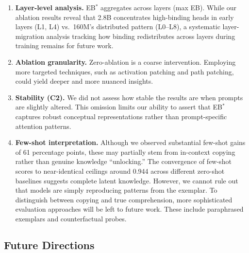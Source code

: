 \documentclass[10pt]{article} %
\begin{document}
\begin{enumerate}
  \item \textbf{Layer-level analysis.} EB$^*$ aggregates across layers (max EB). While our ablation results reveal that 2.8B concentrates high-binding heads in early layers (L1, L4) vs.\ 160M's distributed pattern (L0--L8), a systematic layer-migration analysis tracking how binding redistributes across layers during training remains for future work.

  \item \textbf{Ablation granularity.} Zero-ablation is a coarse intervention.
  Employing more targeted techniques, such as activation patching and path patching, could yield deeper and more nuanced insights.

  \item \textbf{Stability (C2).} We did not assess how stable the results are when prompts are slightly altered. 
  This omission limits our ability to assert that EB$^*$ captures robust conceptual representations rather than prompt-specific attention patterns.

  \item \textbf{Few-shot interpretation.} Although we observed substantial few-shot gains of 61 percentage points, these may partially stem from in-context copying rather than genuine knowledge ``unlocking.'' The convergence of few-shot scores to near-identical ceilings around 0.944 across different zero-shot baselines suggests complete latent knowledge. However, we cannot rule out that models are simply reproducing patterns from the exemplar. To distinguish between copying and true comprehension, more sophisticated evaluation approaches will be left to future work. These include paraphrased exemplars and counterfactual probes.
\end{enumerate}

\subsection{Future Directions}
\end{document}
